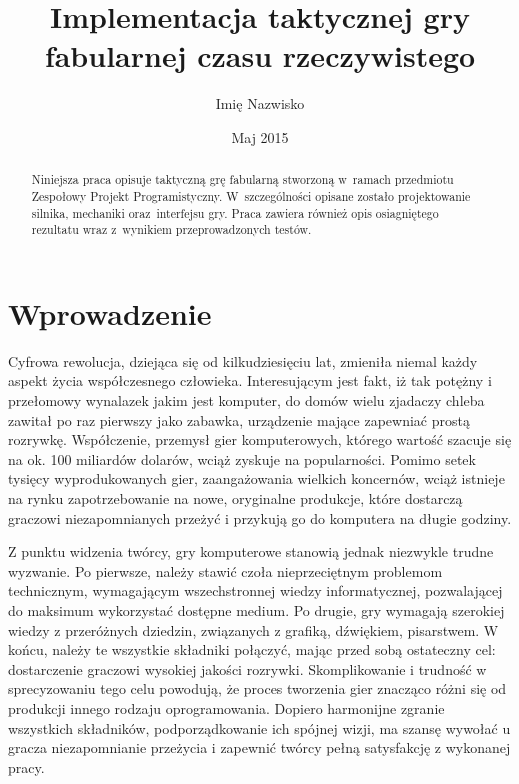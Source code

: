 \documentclass[licencjacka]{pracamgr}
\author	{Imię Nazwisko}
\title{Implementacja taktycznej gry fabularnej czasu rzeczywistego}
\date{Maj 2015}
\begin{document}
\maketitle

\begin{abstract}
  Niniejsza praca opisuje taktyczną grę fabularną stworzoną
  w~ramach przedmiotu Zespołowy Projekt Programistyczny.
  W~szczególności opisane zostało projektowanie silnika,
  mechaniki oraz~interfejsu gry. Praca zawiera również
  opis osiagniętego rezultatu wraz z~wynikiem przeprowadzonych testów.
\end{abstract}

\tableofcontents

\chapter*{Wprowadzenie}
Cyfrowa rewolucja, dziejąca się od kilkudziesięciu lat, zmieniła niemal każdy aspekt życia współczesnego człowieka.
Interesującym jest fakt, iż tak potężny i przełomowy wynalazek jakim jest komputer, do domów wielu zjadaczy chleba
zawitał po raz pierwszy jako zabawka, urządzenie mające zapewniać prostą rozrywkę. Współczenie, przemysł 
gier komputerowych, którego wartość szacuje się na ok. 100 miliardów dolarów, wciąż zyskuje na popularności. 
Pomimo setek tysięcy wyprodukowanych gier, zaangażowania wielkich koncernów, wciąż istnieje na rynku zapotrzebowanie
na nowe, oryginalne produkcje, które dostarczą graczowi niezapomnianych przeżyć i przykują go do komputera na długie godziny.

Z punktu widzenia twórcy, gry komputerowe stanowią jednak niezwykle trudne wyzwanie. Po pierwsze, należy stawić czoła 
nieprzeciętnym problemom technicznym, wymagającym wszechstronnej wiedzy informatycznej, pozwalającej do maksimum wykorzystać
dostępne medium. Po drugie, gry wymagają szerokiej wiedzy z przeróżnych dziedzin, związanych z
grafiką, dźwiękiem, pisarstwem. W końcu, należy te wszystkie składniki połączyć, mając przed sobą ostateczny cel: dostarczenie 
graczowi wysokiej jakości rozrywki. Skomplikowanie i trudność w sprecyzowaniu tego celu powodują, że proces tworzenia gier 
znacząco różni się od produkcji innego rodzaju oprogramowania. Dopiero harmonijne zgranie wszystkich składników, podporządkowanie
ich spójnej wizji, ma szansę wywołać u gracza niezapomnianie przeżycia i zapewnić twórcy pełną satysfakcję z wykonanej pracy. 
\end{document}
